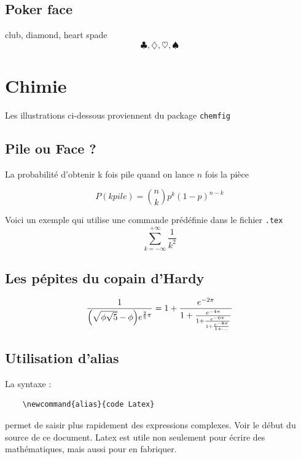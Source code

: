 \documentclass[twocolumn,a4paper]{IEEEtranfr}
\newcommand{\sm}[1]{\sum_{#1=-\infty}^{+\infty}}
\begin{document}
\subsection{Poker face}

club, diamond, heart spade
$$\clubsuit, \diamondsuit, \heartsuit ,\spadesuit$$
\section{Chimie}

Les illustrations ci-dessous proviennent du package {\tt  chemfig}

\subsection{Pile ou Face ? }

La probabilité d'obtenir k fois pile quand on lance $n$ fois la pièce

\begin{equation}
    P(k pile)   = {n \choose k} p^k (1-p)^{ n-k}
\end{equation}

Voici un exemple qui utilise une commande prédéfinie dans le fichier {\tt .tex}
\begin{equation}
\sm{k} \frac{1}{k^2}
\end{equation}
\subsection{Les pépites du copain d'Hardy}

\begin{equation}
  \frac{1}{\Bigl(\sqrt{\phi \sqrt{5}}-\phi\Bigr) e^{\frac25 \pi}} =
    1 + \frac{e^{-2\pi}} 
             {1+\frac{e^{-4\pi}} 
             {1+\frac{e^{-6\pi}}
             {1+\frac{e^{-8\pi}} 
             {1+\ldots} } } }
\end{equation}
\subsection{Utilisation d'alias}

La syntaxe : 
\begin{verbatim} 
    \newcommand{alias}{code Latex}
\end{verbatim}
permet de saisir plus rapidement des expressions complexes. 
Voir le début du source de ce document. Latex est utile non seulement pour
écrire des mathématiques, mais aussi pour en fabriquer.
\end{document}
